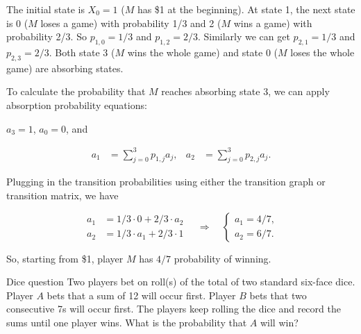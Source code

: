 \begin{solution}
The initial state is $X_0=1$ ($M$ has \$1 at the beginning). At state 1, the next state is
0 ($M$ loses a game) with probability 1/3 and 2 ($M$ wins a game) with probability 2/3.
So $p_{1,0}=1/3$ and $p_{1,2}=2/3$. Similarly we can get $p_{2,1}=1/3$ and
$p_{2,3}=2/3$. Both state 3 ($M$ wins the whole game) and state 0 ($M$ loses the whole
game) are absorbing states.

To calculate the probability that $M$ reaches absorbing state 3, we can apply absorption
probability equations:


$a_3=1$, $a_0=0$, and

\[
\begin{aligned}
a_1&=\sum_{j=0}^{3}p_{1,j}a_j,
&a_2&=\sum_{j=0}^{3}p_{2,j}a_j.
\end{aligned}
\]

Plugging in the transition probabilities using either the transition graph or transition
matrix, we have

\[
\begin{aligned}
a_1&=1/3\cdot0+2/3\cdot a_2\\
a_2&=1/3\cdot a_1+2/3\cdot1
\end{aligned}
\quad\Longrightarrow\quad
\begin{cases}
a_1=4/7,\\
a_2=6/7.
\end{cases}
\]

So, starting from \$1, player $M$ has $4/7$ probability of winning.

\end{solution}

\begin{problem}{Dice question}
Two players bet on roll(s) of the total of two standard six-face dice. Player $A$ bets
that a sum of 12 will occur first. Player $B$ bets that two consecutive 7s will occur first.
The players keep rolling the dice and record the sums until one player wins. What is the
probability that $A$ will win?
\end{problem}

